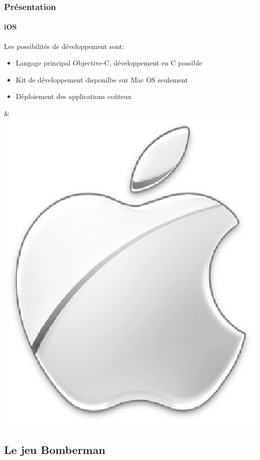 \begin{frame}
\frametitle{Présentation}
\framesubtitle{iOS}
	\begin{minipage}{8cm}
	Les possibilités de développement sont: \\ 

	\begin{itemize}
		\item Langage principal Objective-C, développement en C possible
		\item Kit de développement disponilbe sur Mac OS seulement
		\item Déploiement des applications coûteux
	\end{itemize}
	\end{minipage} & \includegraphics[scale=0.2]{img/apple.eps} 
\end{frame}


\subsection{Le jeu Bomberman}


